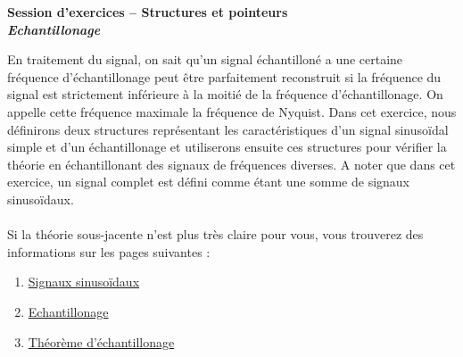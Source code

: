 \documentclass[11pt]{article}
\begin{document}
\begin{center}{\bf Session d'exercices -- Structures et pointeurs}\\
\textbf{\emph{Echantillonage}}
\end{center}

En traitement du signal, on sait qu'un signal échantilloné a une certaine fréquence d'échantillonage peut être parfaitement reconstruit si la fréquence du signal est strictement inférieure à la moitié de la fréquence d'échantillonage. On appelle cette fréquence maximale la fréquence de Nyquist. Dans cet exercice, nous définirons deux structures représentant les caractéristiques d'un signal sinusoïdal simple et d'un échantillonage et utiliserons ensuite ces structures pour vérifier la théorie en échantillonant des signaux de fréquences diverses. A noter que dans cet exercice, un signal complet est défini comme étant une somme de signaux sinusoïdaux.\\
\\
Si la théorie sous-jacente n'est plus très claire pour vous, vous trouverez des informations sur les pages suivantes : 
\begin{enumerate}

\item  \href{https://fr.wikipedia.org/wiki/Signal\_sinuso\%C3\%AFdal}{Signaux sinusoïdaux}
\item \href{https://fr.wikipedia.org/wiki/\%C3\%89chantillonnage\_(signal)}{Echantillonage}
\item \href{https://fr.wikipedia.org/wiki/Th\%C3\%A9or\%C3\%A8me\_d\%27\%C3\%A9chantillonnage}{Théorème d'échantillonage}
\end{enumerate}
\end{document}
